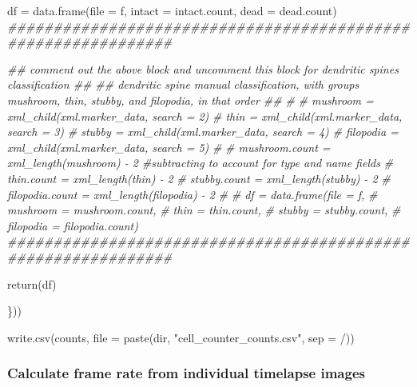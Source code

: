 \documentclass[
  12pt,
  a4paper,
]{book}
\newenvironment{Shaded}{}{}
\newcommand{\AttributeTok}[1]{\textcolor[rgb]{0.49,0.56,0.16}{#1}}
\newcommand{\CommentTok}[1]{\textcolor[rgb]{0.38,0.63,0.69}{\textit{#1}}}
\newcommand{\DocumentationTok}[1]{\textcolor[rgb]{0.73,0.13,0.13}{\textit{#1}}}
\newcommand{\FunctionTok}[1]{\textcolor[rgb]{0.02,0.16,0.49}{#1}}
\newcommand{\NormalTok}[1]{#1}
\newcommand{\OtherTok}[1]{\textcolor[rgb]{0.00,0.44,0.13}{#1}}
\newcommand{\StringTok}[1]{\textcolor[rgb]{0.25,0.44,0.63}{#1}}
\begin{document}
\begin{Shaded}
\begin{Highlighting}[]
\NormalTok{  df }\OtherTok{=} \FunctionTok{data.frame}\NormalTok{(}\AttributeTok{file =}\NormalTok{ f,}
                  \AttributeTok{intact =}\NormalTok{ intact.count,}
                  \AttributeTok{dead =}\NormalTok{ dead.count)}
  \DocumentationTok{\#\#\#\#\#\#\#\#\#\#\#\#\#\#\#\#\#\#\#\#\#\#\#\#\#\#\#\#\#\#\#\#\#\#\#\#\#\#\#\#\#\#\#\#\#\#\#\#\#\#\#\#\#\#\#\#\#\#\#\#\#\#}

  \DocumentationTok{\#\# comment out the above block and uncomment this block for dendritic spines classification \#\#}
  \DocumentationTok{\#\# dendritic spine manual classification, with groups \textquotesingle{}mushroom\textquotesingle{}, \textquotesingle{}thin\textquotesingle{}, \textquotesingle{}stubby\textquotesingle{}, and \textquotesingle{}filopodia\textquotesingle{}, in that order \#\#}
  \CommentTok{\#}
  \CommentTok{\# mushroom = xml\_child(xml.marker\_data, search = 2)}
  \CommentTok{\# thin = xml\_child(xml.marker\_data, search = 3)}
  \CommentTok{\# stubby = xml\_child(xml.marker\_data, search = 4)}
  \CommentTok{\# filopodia = xml\_child(xml.marker\_data, search = 5)}
  \CommentTok{\# }
  \CommentTok{\# mushroom.count = xml\_length(mushroom) {-} 2 \#subtracting to account for type and name fields}
  \CommentTok{\# thin.count = xml\_length(thin) {-} 2}
  \CommentTok{\# stubby.count = xml\_length(stubby) {-} 2}
  \CommentTok{\# filopodia.count = xml\_length(filopodia) {-} 2}
  \CommentTok{\# }
  \CommentTok{\# df = data.frame(file = f, }
  \CommentTok{\#                 mushroom = mushroom.count,}
  \CommentTok{\#                 thin = thin.count,}
  \CommentTok{\#                 stubby = stubby.count,}
  \CommentTok{\#                 filopodia = filopodia.count)}
  \DocumentationTok{\#\#\#\#\#\#\#\#\#\#\#\#\#\#\#\#\#\#\#\#\#\#\#\#\#\#\#\#\#\#\#\#\#\#\#\#\#\#\#\#\#\#\#\#\#\#\#\#\#\#\#\#\#\#\#\#\#\#\#\#\#\#}
  
  \FunctionTok{return}\NormalTok{(df)}
  
\NormalTok{\}))}

\FunctionTok{write.csv}\NormalTok{(counts, }\AttributeTok{file =} \FunctionTok{paste}\NormalTok{(dir, }\StringTok{"cell\_counter\_counts.csv"}\NormalTok{, }\AttributeTok{sep =} \StringTok{\textquotesingle{}/\textquotesingle{}}\NormalTok{))}
\end{Highlighting}
\end{Shaded}

\hypertarget{timestamp-corr}{%
\subsubsection{Calculate frame rate from individual timelapse images}\label{timestamp-corr}}
\end{document}
